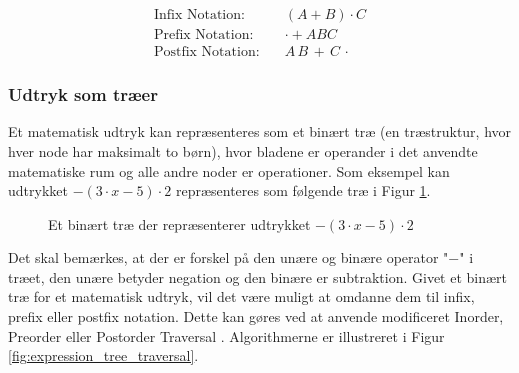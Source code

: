 \begin{align*}
    \text{Infix Notation:} \quad & (A + B) \cdot C \\
    \text{Prefix Notation:} \quad &  \cdot + A B C  \\
    \text{Postfix Notation:} \quad & A \, B \, + \, C \, \cdot
\end{align*}

 

\subsubsection{Udtryk som træer} \label{sec:expression_as_trees}
Et matematisk udtryk kan repræsenteres som et binært træ (en træstruktur, hvor hver node har maksimalt to børn), hvor bladene er operander i det anvendte matematiske rum og alle andre noder er operationer. Som eksempel kan udtrykket $-(3 \cdot x - 5) \cdot 2$ repræsenteres som følgende træ i Figur \ref{fig:expression_tree}. 


\begin{figure}[H]
\centering
{}
\caption{Et binært træ der repræsenterer udtrykket $-(3 \cdot x - 5) \cdot 2$}
\label{fig:expression_tree}
\end{figure}
Det skal bemærkes, at der er forskel på den unære og binære operator "$-$" i træet, den unære betyder negation og den binære er subtraktion. Givet et binært træ for et matematisk udtryk, vil det være muligt at omdanne dem til infix, prefix eller postfix notation. Dette kan gøres ved at anvende modificeret Inorder, Preorder eller Postorder Traversal . Algorithmerne er illustreret i Figur \ref{fig:expression_tree_traversal}.


